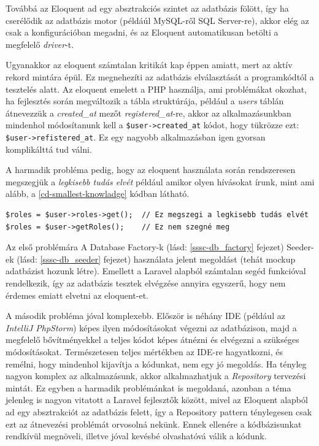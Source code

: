 \documentclass[a4paper,12pt]{thesis-ekf}
\theoremstyle{definition}
\begin{document}
				Továbbá az Eloquent ad egy absztrakciós szintet az adatbázis fölött, így ha cserélődik az adatbázis motor (példáúl MySQL-ről SQL Server-re), akkor elég az csak a konfigurációban megadni, és az Eloquent automatikusan betölti a megfelelő \emph{driver}-t.
				
				Ugyanakkor az eloquent számtalan kritikát kap éppen amiatt, mert az aktív rekord mintára épül. Ez megnehezíti az adatbázis elválasztását a programkódtól a tesztelés alatt. Az eloquent emelett a PHP  használja, ami problémákat okozhat, ha fejlesztés során megváltozik a tábla struktúrája, például a \emph{users} táblán átnevezzük a \emph{created\_at} mezőt \emph{registered\_at}-re, akkor az alkalmazásunkban mindenhol módosítanunk kell a \texttt{\$user->created\_at} kódot, hogy tükrözze ezt: \texttt{\$user->refistered\_at}. Ez egy nagyobb alkalmazásban igen gyorsan komplikálttá tud válni.\cite{eloquent-critics}
				
				A harmadik probléma pedig, hogy az eloquent használata során rendszeresen megszegjük a \emph{legkisebb tudás elvét} például amikor olyen hívásokat írunk, mint ami alább, a \ref{cd-smallest-knowladge} kódban látható.\cite{eloquent-critics}
				\begin{lstlisting}[caption={Legkisebb tud\'as elve, demonstr\'aci\'o},captionpos=b,label={cd-smallest-knowladge}]
$roles = $user->roles->get();  // Ez megszegi a legkisebb tudás elvét
$roles = $user->getRoles();    // Ez nem szegné meg
				\end{lstlisting}
				
				Az első problémára A Database Factory-k (lásd: \ref{sssc-db_factory} fejezet) Seeder-ek (lásd: \ref{sssc-db_seeder} fejezet) használata jelent megoldást (tehát mockup adatbázist hozunk létre). Emellett a Laravel alapból számtalan segéd funkcióval rendelkezik, így az adatbázis tesztek elvégzése annyira egyszerű, hogy nem érdemes emiatt elvetni az eloquent-et.\cite{database-testing}
				
				 A második probléma jóval komplexebb. Először is néhány IDE (például az \emph{IntelliJ PhpStorm}) képes ilyen módosításokat végezni az adatbázison, majd a megfelelő bővítményekkel a teljes kódot képes átnézni és elvégezni a szükséges módosításokat. Természetesen teljes mértékben az IDE-re hagyatkozni, és remélni, hogy mindenhol kijavítja a kódunkat, nem egy jó megoldás. Ha tényleg nagyon komplex az alkalmazásunk, akkor alkalmazhatjuk a \emph{Repository} tervezési mintát. Ez egyben a harmadik problémánkat is megoldaná, azonban a téma jelenleg is nagyon vitatott a Laravel fejlesztők között, mivel az Eloquent alapból ad egy absztrakciót az adatbázis felett, így a Repository pattern ténylegesen csak ezt az átnevezési problémát orvosolná nekünk. Ennek ellenére a kódbázisunkat rendkívül megnöveli, illetve jóval kevésbé olvashatóvá válik a kódunk.\cite{repository-pattern}
				 
\end{document}
